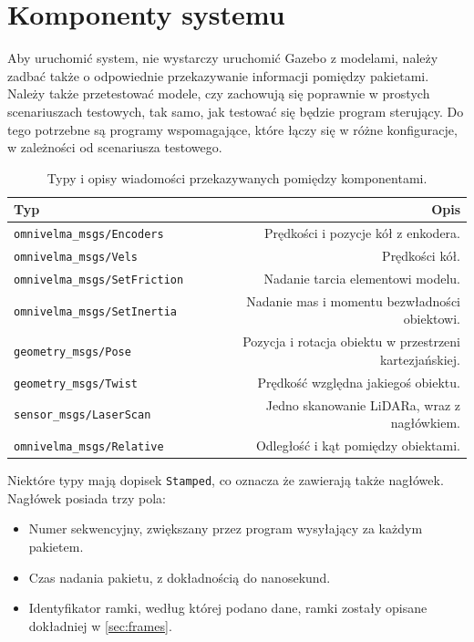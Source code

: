 \chapter{Komponenty systemu}
\label{sec:components}
Aby uruchomić system, nie wystarczy uruchomić Gazebo z modelami, należy zadbać także o odpowiednie przekazywanie informacji pomiędzy pakietami.
Należy także przetestować modele, czy zachowują się poprawnie w prostych scenariuszach testowych, tak samo, jak testować się będzie program sterujący.
Do tego potrzebne są programy wspomagające, które łączy się w różne konfiguracje, w zależności od scenariusza testowego.

\begin{table}
	\centering
	\begin{tabular}{l r}
		Typ & Opis \\
		\hline
		\texttt{omnivelma\_msgs/Encoders} & Prędkości i pozycje kół z enkodera. \\
		\texttt{omnivelma\_msgs/Vels} & Prędkości kół. \\
		\texttt{omnivelma\_msgs/SetFriction} & Nadanie tarcia elementowi modelu. \\
		\texttt{omnivelma\_msgs/SetInertia} & Nadanie mas i momentu bezwładności obiektowi. \\
		\texttt{geometry\_msgs/Pose} & Pozycja i rotacja obiektu w przestrzeni kartezjańskiej. \\
		\texttt{geometry\_msgs/Twist} & Prędkość względna jakiegoś obiektu. \\
		\texttt{sensor\_msgs/LaserScan} & Jedno skanowanie LiDARa, wraz z nagłówkiem. \\
		\texttt{omnivelma\_msgs/Relative} & Odległość i kąt pomiędzy obiektami. \\
	\end{tabular}
	\caption{Typy i opisy wiadomości przekazywanych pomiędzy komponentami.}
	\label{tab:messages}
\end{table}

Niektóre typy mają dopisek \texttt{Stamped}, co oznacza że zawierają także nagłówek.
Nagłówek posiada trzy pola:
\begin{itemize}
	\item Numer sekwencyjny, zwiększany przez program wysyłający za każdym pakietem.
	\item Czas nadania pakietu, z dokładnością do nanosekund.
	\item Identyfikator ramki, według której podano dane, ramki zostały opisane dokładniej w \ref{sec:frames}.
\end{itemize}


